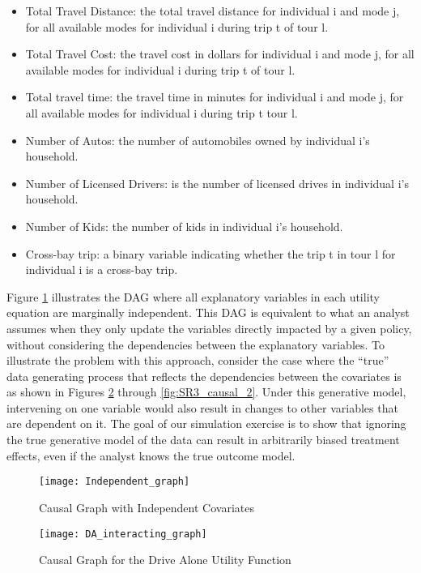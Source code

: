 \begin{itemize}
  \item Total Travel Distance: the total travel distance for individual i and mode j, for all available modes for individual i during trip t of tour l.
  \item Total Travel Cost: the travel cost in dollars for individual i and mode j, for all available modes for individual i during trip t of tour l.
  \item Total travel time: the travel time in minutes for individual i and mode j, for all available modes for individual i during trip t tour l.
  \item Number of Autos: the number of automobiles owned by individual i's household.
  \item Number of Licensed Drivers: is the number of licensed drives in individual i's household.
  \item Number of Kids: the number of kids in individual i's household.
  \item Cross-bay trip: a binary variable indicating whether the trip t in tour l for individual i is a cross-bay trip.
\end{itemize}

Figure \ref{fig:IND_GRAPH} illustrates the DAG where all explanatory variables in each utility equation are marginally independent.
This DAG is equivalent to what an analyst assumes when they only update the variables directly impacted by a given policy, without considering the dependencies between the explanatory variables. 
To illustrate the problem with this approach, consider the case where the ``true'' data generating process that reflects the dependencies between the covariates is as shown in Figures \ref{fig:DA_causal_2} through \ref{fig:SR3_causal_2}. 
Under this generative model, intervening on one variable would also result in changes to other variables that are dependent on it.
The goal of our simulation exercise is to show that ignoring the true generative model of the data can result in arbitrarily biased treatment effects, even if the analyst knows the true outcome model.

\begin{figure}
   \centering
   \texttt{[image: Independent\_graph]}
   \caption{Causal Graph with Independent Covariates}
   \label{fig:IND_GRAPH}
\end{figure}

\begin{figure}
   \centering
   \texttt{[image: DA\_interacting\_graph]}
   \caption{Causal Graph for the Drive Alone Utility Function}
   \label{fig:DA_causal_2}
\end{figure}

